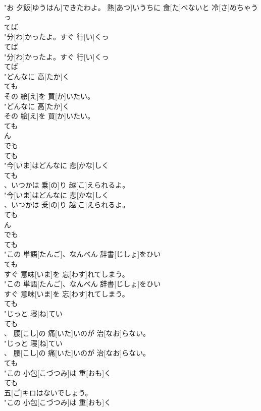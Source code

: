 \documentclass[8pt]{extreport}
\begin{document}
\begin{CJK}{UTF8}{min}
\\	"お 夕飯[ゆうはん]できたわよ。 熱[あつ]いうちに 食[た]べないと 冷[さ]めちゃうっ
\\	てば
\\	"分[わ]かったよ。すぐ 行[い]くっ
\\	てば
\\	"分[わ]かったよ。すぐ 行[い]くっ
\\	てば
\\	"どんなに 高[たか]く
\\	ても
\\	その 絵[え]を 買[か]いたい。
\\	"どんなに 高[たか]く
\\	その 絵[え]を 買[か]いたい。
\\	ても 
\\	ん 
\\	でも 
\\	ても
\\	"今[いま]はどんなに 悲[かな]しく
\\	ても
\\	、いつかは 乗[の]り 越[こ]えられるよ。
\\	"今[いま]はどんなに 悲[かな]しく
\\	、いつかは 乗[の]り 越[こ]えられるよ。
\\	ても 
\\	ん 
\\	でも 
\\	ても
\\	"この 単語[たんご]、なんべん 辞書[じしょ]をひい
\\	ても
\\	すぐ 意味[いま]を 忘[わす]れてしまう。
\\	"この 単語[たんご]、なんべん 辞書[じしょ]をひい
\\	すぐ 意味[いま]を 忘[わす]れてしまう。
\\	ても
\\	"じっと 寝[ね]てい
\\	ても
\\	、 腰[こし]の 痛[いた]いのが 治[なお]らない。
\\	"じっと 寝[ね]てい
\\	、 腰[こし]の 痛[いた]いのが 治[なお]らない。
\\	ても
\\	"この 小包[こづつみ]は 重[おも]く
\\	ても
\\	五[ご]キロはないでしょう。
\\	"この 小包[こづつみ]は 重[おも]く

\end{CJK}
\end{document}
